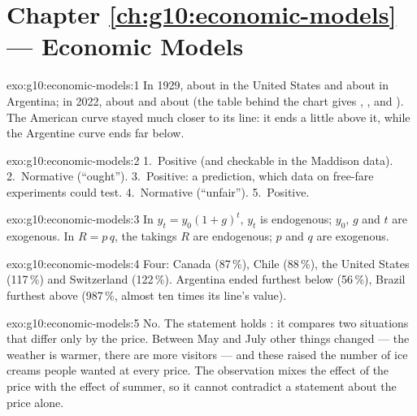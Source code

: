 \section*{Chapter \ref{ch:g10:economic-models} --- Economic Models}

\begin{solution}{exo:g10:economic-models:1}
In 1929, about  in the United States and about  in Argentina; in 2022, about
 and about  (the table behind the chart gives , ,
 and ). The American curve stayed much closer to its line: it ends a little
above it, while the Argentine curve ends far below.
\end{solution}

\begin{solution}{exo:g10:economic-models:2}
1.~Positive (and checkable in the Maddison data). 2.~Normative (``ought''). 3.~Positive: a
prediction, which data on free-fare experiments could test. 4.~Normative (``unfair''). 5.~Positive.
\end{solution}

\begin{solution}{exo:g10:economic-models:3}
In $y_t = y_0(1+g)^t$, $y_t$ is endogenous; $y_0$, $g$ and $t$ are exogenous. In $R = p\,q$, the
takings $R$ are endogenous; $p$ and $q$ are exogenous.
\end{solution}

\begin{solution}{exo:g10:economic-models:4}
Four: Canada (87\,\%), Chile (88\,\%), the United States (117\,\%) and Switzerland (122\,\%).
Argentina ended furthest below (56\,\%), Brazil furthest above (987\,\%, almost ten times its line's
value).
\end{solution}

\begin{solution}{exo:g10:economic-models:5}
No. The statement holds : it compares two situations that differ only by the price.
Between May and July other things changed --- the weather is warmer, there are more visitors --- and
these raised the number of ice creams people wanted at every price. The observation mixes the effect
of the price with the effect of summer, so it cannot contradict a statement about the price alone.
\end{solution}

